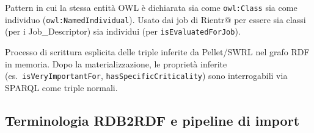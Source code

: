 \documentclass[a4paper,12pt]{article}
\begin{document}
\begin{description}[leftmargin=4cm, labelwidth=3.8cm, labelsep=0.2cm]
\item[\textbf{Punning (OWL)}]
  Pattern in cui la stessa entit\`{a} OWL \`{e} dichiarata sia come
  \texttt{owl:Class} sia come individuo (\texttt{owl:NamedIndividual}).
  Usato dai job di Rientr@ per essere sia classi (per i Job\_Descriptor)
  sia individui (per \texttt{isEvaluatedForJob}).

\item[\textbf{Materializzazione}]
  Processo di scrittura esplicita delle triple inferite da Pellet/SWRL
  nel grafo RDF in memoria. Dopo la materializzazione, le propriet\`{a}
  inferite (es.\ \texttt{isVeryImportantFor}, \texttt{hasSpecificCriticality})
  sono interrogabili via SPARQL come triple normali.

\end{description}

\subsection*{Terminologia RDB2RDF e pipeline di import}
\end{document}
